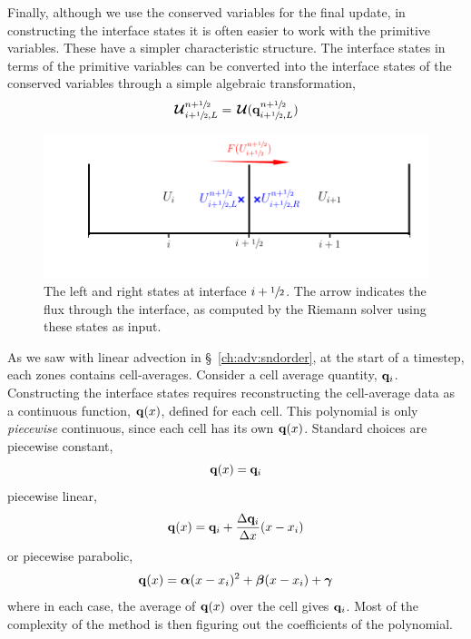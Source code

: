 Finally, although we use the conserved variables for the final update,
in constructing the interface states it is often easier to work with
the primitive variables.  These have a simpler characteristic
structure.  The interface states in terms of the primitive variables
can be converted into the interface states of the conserved variables
through a simple algebraic transformation,
\begin{equation}
{\,\boldsymbol{\mathcal{U}}}_{i+{\sfrac{1}{2}},L}^{n+{\sfrac{1}{2}}} = {\,\boldsymbol{\mathcal{U}}}({\bf q}_{i+{\sfrac{1}{2}},L}^{n+{\sfrac{1}{2}}})
\end{equation}

\begin{figure}[t]
\centering
\includegraphics[width=\linewidth]{riemann_comp}
\caption[The left and right states for the Riemann
  problem]{\label{fig:riemann} The left and right states at interface
  $i+{\sfrac{1}{2}}$.  The arrow indicates the flux through the interface, as
  computed by the Riemann solver using these states as input.}
\end{figure}

As we saw with linear advection in \S~\ref{ch:adv:sndorder},
at the start of a timestep, each zones contains cell-averages.
Consider a cell average quantity, ${\bf q}_i$.
Constructing the interface states requires reconstructing the
cell-average data as a continuous function, ${\bf q}(x)$, defined for
each cell.  This polynomial is only {\em piecewise} continuous, since
each cell has its own ${\bf q}(x)$.  Standard choices are piecewise constant,
\begin{equation}
{\bf q}(x) = {\bf q}_i
\end{equation}
piecewise linear,
\begin{equation}
{\bf q}(x) = {\bf q}_i + \frac{\Delta {\bf q}_i}{\Delta x}(x - x_i)
\end{equation}
or piecewise parabolic,
\begin{equation}
{\bf q}(x) = \boldsymbol{\alpha} (x - x_i)^2 + \boldsymbol{\beta} (x - x_i) + \boldsymbol{\gamma}
\end{equation}
where in each case, the average of ${\bf q}(x)$ over the cell gives ${\bf q}_i$.
Most of the complexity of the method is then figuring out the coefficients
of the polynomial.

